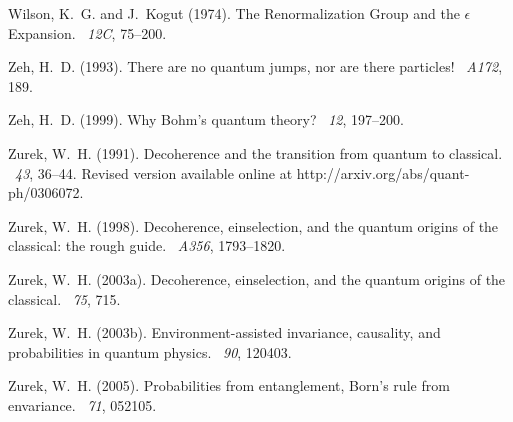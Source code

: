 \documentclass[12pt]{article}
\begin{document}
\begin{thebibliography}{}
Wilson, K.~G. and J.~Kogut (1974).
\newblock The {R}enormalization {G}roup and the $\epsilon$ {E}xpansion.
~{\em 12C}, 75--200.

Zeh, H.~D. (1993).
\newblock There are no quantum jumps, nor are there particles!
~{\em A172}, 189.

Zeh, H.~D. (1999).
\newblock Why {B}ohm's quantum theory?
~{\em 12}, 197--200.

Zurek, W.~H. (1991).
\newblock Decoherence and the transition from quantum to classical.
~{\em 43}, 36--44.
\newblock Revised version available online at
  http://arxiv.org/abs/quant-ph/0306072.

Zurek, W.~H. (1998).
\newblock Decoherence, einselection, and the quantum origins of the classical:
  the rough guide.
~{\em A356}, 1793--1820.

Zurek, W.~H. (2003a).
\newblock Decoherence, einselection, and the quantum origins of the classical.
~{\em 75}, 715.

Zurek, W.~H. (2003b).
\newblock Environment-assisted invariance, causality, and probabilities in
  quantum physics.
~{\em 90}, 120403.

Zurek, W.~H. (2005).
\newblock Probabilities from entanglement, {B}orn's rule from envariance.
~{\em 71}, 052105.

\end{thebibliography}

%
\end{document}
